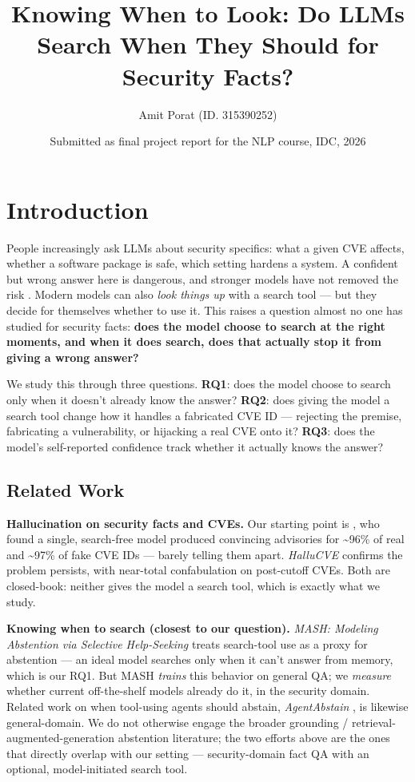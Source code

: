 \documentclass[11pt]{article}
\title{Knowing When to Look: Do LLMs Search When They Should for Security Facts?}
\author{Amit Porat (ID. 315390252)}
\date{Submitted as final project report for the NLP course, IDC, 2026}
\begin{document}
\maketitle

\section{Introduction}

People increasingly ask LLMs about security specifics: what a given CVE affects, whether a software package is safe, which setting hardens a system. A confident but wrong answer here is dangerous, and stronger models have not removed the risk \citep{abdullah2025security}. Modern models can also \textit{look things up} with a search tool — but they decide for themselves whether to use it. This raises a question almost no one has studied for security facts: \textbf{does the model choose to search at the right moments, and when it does search, does that actually stop it from giving a wrong answer?}

We study this through three questions. \textbf{RQ1}: does the model choose to search only when it doesn't already know the answer? \textbf{RQ2}: does giving the model a search tool change how it handles a fabricated CVE ID — rejecting the premise, fabricating a vulnerability, or hijacking a real CVE onto it? \textbf{RQ3}: does the model's self-reported confidence track whether it actually knows the answer?

\subsection{Related Work}

\textbf{Hallucination on security facts and CVEs.} Our starting point is \citet{abdullah2025security}, who found a single, search-free model produced convincing advisories for \textasciitilde{}96\% of real and \textasciitilde{}97\% of fake CVE IDs — barely telling them apart. \textit{HalluCVE} \citep{daoduy2026hallucve} confirms the problem persists, with near-total confabulation on post-cutoff CVEs. Both are closed-book: neither gives the model a search tool, which is exactly what we study.

\textbf{Knowing when to search (closest to our question).} \textit{MASH: Modeling Abstention via Selective Help-Seeking} \citep{gul2025mash} treats search-tool use as a proxy for abstention — an ideal model searches only when it can't answer from memory, which is our RQ1. But MASH \textit{trains} this behavior on general QA; we \textit{measure} whether current off-the-shelf models already do it, in the security domain. Related work on when tool-using agents should abstain, \textit{AgentAbstain} \citep{liu2026agentabstain}, is likewise general-domain. We do not otherwise engage the broader grounding / retrieval-augmented-generation abstention literature; the two efforts above are the ones that directly overlap with our setting — security-domain fact QA with an optional, model-initiated search tool.
\end{document}
